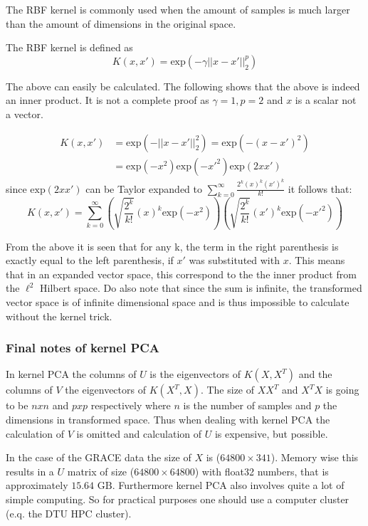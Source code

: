 The RBF kernel is commonly used when the amount of samples is much larger than the amount of dimensions in the original space.

The RBF kernel is defined as
\begin{equation}
K(x,x')=\mathrm{exp}(-\gamma ||x-x'||^p_2)
\end{equation}

The above can easily be calculated. The following shows that the above is indeed an inner product. It is not a complete proof as $\gamma=1, p=2$ and $x$ is a scalar not a vector.

\begin{equation}
\begin{split}
	K(x,x')&=\mathrm{exp}(- ||x-x'||^2_2)=\mathrm{exp}(- (x-x')^2) \\
		  &= \mathrm{exp}(-x^2) \mathrm{exp}(-{x'}^2) \mathrm{exp}(2 x x')
\end{split}
\end{equation}
since $\mathrm{exp}(2 x x')$ can be Taylor expanded to $\sum_{k=0}^\infty \frac{2^k(x)^k (x')^k}{k!}$ it follows that:
\begin{equation}
K(x,x') = \sum_{k=0}^\infty \left(\sqrt{\frac{2^k}{k!}} (x)^k \mathrm{exp}(-x^2)\right)\left(\sqrt{\frac{2^k}{k!}} (x')^k \mathrm{exp}(-{x'}^2)\right)
\end{equation}

From the above it is seen that for any k, the term in the right parenthesis is exactly equal to the left parenthesis, if $x'$ was substituted with $x$. This means that in an expanded vector space, this correspond to the the inner product from the $\ell^2$ Hilbert space. Do also note that since the sum is infinite, the transformed vector space is of infinite dimensional space and is thus impossible to calculate without the kernel trick.

\subsubsection{Final notes of kernel PCA}

In kernel PCA the columns of $U$ is the eigenvectors of $K(X,X^T)$ and the columns of $V$ the eigenvectors of $K(X^T,X)$. The size of $X X^T$ and $X^T X$ is going to be $nxn$ and $pxp$ respectively where $n$ is the number of samples and $p$ the dimensions in transformed space. Thus when dealing with kernel PCA the calculation of $V$ is omitted and calculation of $U$ is expensive, but possible.

In the case of the GRACE data the size of $X$ is ($64800 \times 341$). Memory wise this results in a $U$ matrix of size ($64800 \times 64800$) with float32 numbers, that is approximately $15.64\text{ GB}$. Furthermore kernel PCA also involves quite a lot of simple computing. So for practical purposes one should use a computer cluster (e.q. the DTU HPC cluster).

